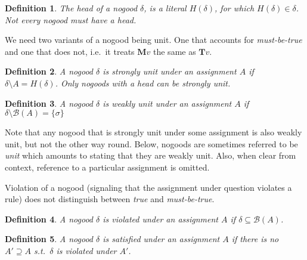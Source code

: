\documentclass{vutinfth} %
\newcommand{\todo}[1]{{\color{red}\textbf{TODO: {#1}}}} %
\newtheorem{definition}{Definition}[chapter]
\newcommand{\mbt}{must-be-true\xspace}
\newcommand{\bass}{\mathcal{B}}
\newcommand{\ass}{A}
\newcommand{\bT}{\mathbf{T}}
\newcommand{\bM}{\mathbf{M}}
\newcommand{\bF}{\mathbf{F}}
\newcommand{\headf}{H}
\newcommand{\bodyf}{B}
\newcommand{\bsgl}{\sigma}
\begin{document}
\begin{definition}
The \emph{head} of a nogood $\delta$, is a literal $\headf(\delta)$, for which $\headf(\delta) \in \delta$. Not every nogood must have a head.%
\end{definition}



We need two variants of a nogood being unit. One that accounts for \emph{\mbt} and one that does not, i.e.~it treats $\bM v$ the same as $\bT v$.

\begin{definition}
A nogood $\delta$ is \emph{strongly unit} under an assignment $\ass$ if $\delta \setminus \ass = \headf(\delta)$. Only nogoods with a head can be strongly unit.
\end{definition}

\begin{definition}
A nogood $\delta$ is \emph{weakly unit} under an assignment $\ass$ if $\delta \setminus \bass(\ass) = \{ \bsgl \}$
\end{definition}

Note that any nogood that is strongly unit under some assignment is also weakly unit, but not the other way round. Below, nogoods are sometimes referred to be \emph{unit} which amounts to stating that they are weakly unit. Also, when clear from context, reference to a particular assignment is omitted.

Violation of a nogood (signaling that the assignment under question violates a rule) does not distinguish between \emph{true} and \emph{\mbt}.

\begin{definition}
\label{def:vio}
A nogood $\delta$ is \emph{violated} under an assignment $\ass$ if $\delta \subseteq \bass(\ass)$.
\end{definition}

\begin{definition}
A nogood $\delta$ is \emph{satisfied} under an assignment $\ass$ if there is no $\ass' \supseteq \ass$ s.t.~$\delta$ is violated under $\ass'$.
\end{definition}
\end{document}

